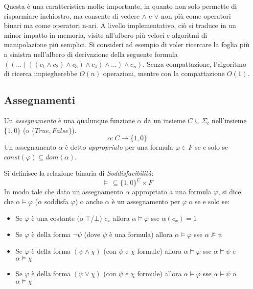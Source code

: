 \documentclass[./main.tex]{subfiles}
\begin{document}
Questa è una caratteristica molto importante, in quanto non solo permette di risparmiare inchiostro, ma consente di vedere
$\land$ e $\lor$ non più come operatori binari ma come operatori n-ari. A livello implementativo, ciò si traduce in un minor
impatto in memoria, visite all'albero più veloci e algoritmi di manipolazione più semplici. Si consideri ad esempio di voler ricercare la 
foglia più a sinistra nell'albero di derivazione della seguente formula $(( ... (((c_1 \land c_2) \land c_3) \land c_4) \land ... )\land c_n)$.
Senza compattazione, l'algoritmo di ricerca impiegherebbe $O(n)$ operazioni, mentre con la compattazione $O(1)$.




\subsection{Assegnamenti}

Un \textit{assegnamento} è una qualunque funzione $\alpha$ da un 
insieme $C \subseteq \Sigma_c$ nell'insieme $\{1, 0\}$ (o $\{True, False\}$).
$$ \alpha : C \rightarrow \{1, 0\} $$
Un assegnamento $\alpha$ è detto \textit{appropriato}  per una formula $\varphi \in F$ se e solo se $const(\varphi) \subseteq dom(\alpha)$.

Si definisce la relazione binaria di \textit{Soddisfacibilità}: 
$$\models \, \subseteq \{1, 0\}^{C} \times F$$
In modo tale che dato un assegnamento $\alpha$ appropriato a una formula $\varphi$, si dice che $\alpha \models \varphi$ ($\alpha$ soddisfa $\varphi$) 
o anche $\alpha$ è un assegnamento per $\varphi$ o  se e solo se:

\begin{itemize}
  \item Se $\varphi$ è una costante (o $\top$/$\bot$) $c_x$ allora $\alpha \models \varphi$ sse $\alpha(c_x) = 1$
  \item Se $\varphi$ è della forma $\lnot \psi$ (dove $\psi$ è una formula) allora $\alpha \models \varphi$ sse $\alpha \not\models \psi$
  \item Se $\varphi$ è della forma $(\psi \land \chi)$ (con $\psi$ e $\chi$ formule) allora $\alpha \models \varphi$ sse $\alpha \models \psi$ e $\alpha \models \chi$
  \item Se $\varphi$ è della forma $(\psi \lor \chi)$ (con $\psi$ e $\chi$ formule) allora $\alpha \models \varphi$ sse $\alpha \models \psi$ o $\alpha \models \chi$
\end{itemize}
\end{document}
